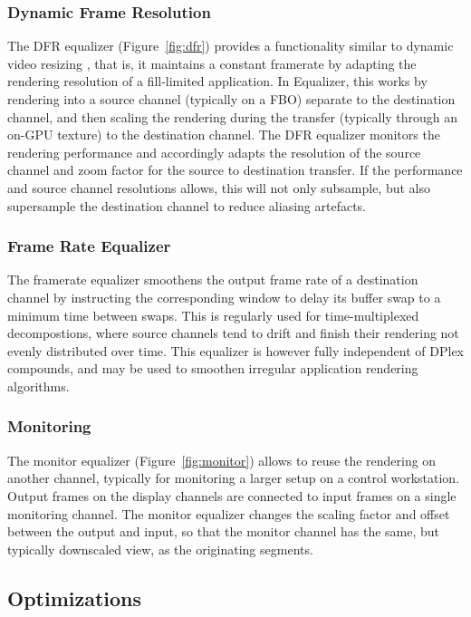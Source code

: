 \documentclass[10pt,journal,compsoc]{IEEEtran}
\newcommand{\fig}[1]{Figure~\ref{#1}}
\begin{document}
\subsubsection{Dynamic Frame Resolution}

The DFR equalizer (\fig{fig:dfr}) provides a functionality similar to dynamic
video resizing \cite{MBDM:97}, that is, it maintains a constant framerate by
adapting the rendering resolution of a fill-limited application. In Equalizer,
this works by rendering into a source channel (typically on a FBO) separate to
the destination channel, and then scaling the rendering during the transfer
(typically through an on-GPU texture) to the destination channel. The DFR
equalizer monitors the rendering performance and accordingly adapts the
resolution of the source channel and zoom factor for the source to destination
transfer. If the performance and source channel resolutions allows, this will
not only subsample, but also supersample the destination channel to reduce
aliasing artefacts.

\subsubsection{Frame Rate Equalizer}\label{SEC_framerateEq}

The framerate equalizer smoothens the output frame rate of a destination
channel by instructing the corresponding window to delay its buffer swap to a
minimum time between swaps. This is regularly used for time-multiplexed
decompostions, where source channels tend to drift and finish their rendering
not evenly distributed over time. This equalizer is however fully independent of
DPlex compounds, and may be used to smoothen irregular application rendering
algorithms.

\subsubsection{Monitoring}

The monitor equalizer (\fig{fig:monitor}) allows to reuse the rendering on
another channel, typically for monitoring a larger setup on a control
workstation. Output frames on the display channels are connected to input frames
on a single monitoring channel. The monitor equalizer changes the scaling factor
and offset between the output and input, so that the monitor channel has the
same, but typically downscaled view, as the originating segments.

\subsection{Optimizations}
\end{document}

